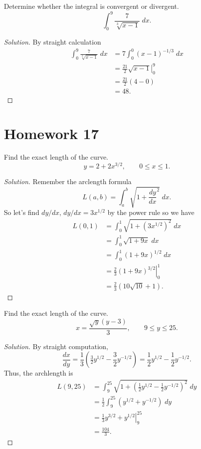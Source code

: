 \begin{problem}[WebAssign, HW 16, \# 9]
Determine whether the integral is convergent or divergent.
\[
\int_0^9\frac{7}{\sqrt[3]{x-1}}\;dx.
\]
\end{problem}
\begin{proof}[Solution]
By straight calculation
\begin{align*}
\int_0^9\frac{7}{\sqrt[3]{x-1}}\;dx
&=7\int_0^0(x-1)^{-1/3}\;dx\\
&=\frac{21}{2}\left.\sqrt{x-1}\right|_0^9\\
&=\frac{21}{2}\left(4-0\right)\\
&=\boxed{48.}
\end{align*}
\end{proof}

\section{Homework 17}
\begin{problem}[WebAssign, HW 17, \# 1]
Find the exact length of the curve.
\[
y=2+2x^{3/2},\qquad 0\leq x\leq 1.
\]
\end{problem}
\begin{proof}[Solution]
Remember the arclength formula
\begin{equation}
  \label{eq:arclength}
L(a,b)=\int_a^b\sqrt{1+\frac{dy}{dx}^2}\;dx.
\end{equation}
So let's find $dy/dx$, $dy/dx=3x^{1/2}$ by the power rule so we have
\begin{align*}
L(0,1)&=\int_0^1\sqrt{1+\left(3x^{1/2}\right)^2}\;dx\\
&=\int_0^1\sqrt{1+9x}\;dx\\
&=\int_0^1(1+9x)^{1/2}\;dx\\
&=\frac{2}{3}\left.(1+9x)^{3/2}\right|_0^1\\
      &=\boxed{\frac{2}{3}\left(10\sqrt{10}+1\right).}
\end{align*}
\end{proof}

\begin{problem}[WebAssign, HW 17, \# 2]
Find the exact length of the curve.
\[
x=\frac{\sqrt{y}(y-3)}{3},\qquad 9\leq y\leq 25.
\]
\end{problem}
\begin{proof}[Solution]
By straight computation,
\[
\frac{dx}{dy}=
\frac{1}{3}\left(\tfrac{3}{2}y^{1/2}-\frac{3}{2}y^{-1/2}\right)=
\frac{1}{2}y^{1/2}-\frac{1}{2}y^{-1/2}.
\]
Thus, the archlength is
\begin{align*}
L(9,25)
&=\int_9^{25}\sqrt{1+\left(\frac{1}{2}y^{1/2}-\frac{1}{2}y^{-1/2}\right)^2}\;dy\\
&=\frac{1}{2}\int_9^{25}\left(y^{1/2}+y^{-1/2}\right)\;dy\\
&=\left.\frac{1}{3}y^{3/2}+y^{1/2}\right|_9^{25}\\
&=\boxed{\frac{104}{3}.}
\end{align*}
\end{proof}

